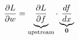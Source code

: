 \documentclass[preview]{standalone}
\begin{document}
\begin{align*}
\special{dvisvgm:raw <g id='unique000'>}\frac{\partial L}{\partial w} = \underbrace{\frac{\partial L}{\partial f}}_{\text{upstream}} \cdot \underbrace{\frac{df}{dx}}_{\mathbf{0}}\special{dvisvgm:raw </g>}
\end{align*}
\end{document}

